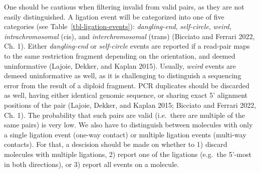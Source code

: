 \documentclass[
  11pt,
  a4paper,
]{scrbook}
\begin{document}
One should be cautious when filtering invalid from valid pairs, as they
are not easily distinguished. A ligation event will be categorized into
one of five categories (see Table~\ref{tbl-ligation-events}):
\emph{dangling-end}, \emph{self-circle}, \emph{weird},
\emph{intrachromosomal} (cis), and \emph{interchromosomal} (trans)
(Bicciato and Ferrari 2022, Ch. 1). Either \emph{dangling-end} or
\emph{self-circle} events are reported if a read-pair maps to the same
restriction fragment depending on the orientation, and deemed
uninformative (Lajoie, Dekker, and Kaplan 2015). Usually, \emph{weird}
events are demeed uninformative as well, as it is challenging to
distinguish a sequencing error from the result of a diploid fragment.
PCR duplicates should be discarded as well, having either identical
genomic sequence, or sharing exact 5' alignment positions of the pair
(Lajoie, Dekker, and Kaplan 2015; Bicciato and Ferrari 2022, Ch. 1). The
probability that such pairs are valid (i.e.~there are multiple of the
same pairs) is very low. We also have to distinguish between molecules
with only a single ligation event (one-way contact) or multiple ligation
events (multi-way contacts). For that, a descision should be made on
whether to 1) discard molecules with multiple ligations, 2) report one
of the ligations (e.g.~the 5'-most in both directions), or 3) report all
events on a molecule.
\end{document}
